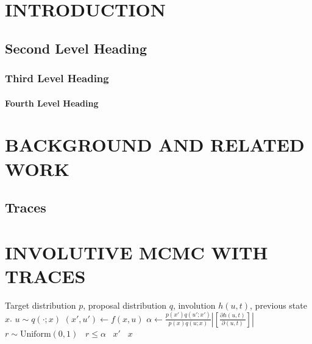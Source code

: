 \documentclass[twoside]{article}
\begin{document}
\section{INTRODUCTION}


\subsection{Second Level Heading}

\subsubsection{Third Level Heading}

\paragraph{Fourth Level Heading}

\section{BACKGROUND AND RELATED WORK}

\subsection{Traces}



\section{INVOLUTIVE MCMC WITH TRACES}

\begin{algorithmic}
\Require Target distribution $p$, proposal distribution $q$, involution $h(u, t)$, previous state $x$.
    \State $u \sim q(\cdot; x)$ 
    \State $(x', u') \gets f(x, u)$ 
    \State $\alpha \gets
        \frac{p(x') q(u'; x')}{p(x) q(u; x)} \left| \left[ \frac{\partial h(u, t)}{\partial (u, t)} \right] \right|$
    \State $r \sim \mathrm{Uniform}(0, 1)$
    \State \algorithmicif \, $r \le \alpha$ \algorithmicthen \, \Return $x'$ \algorithmicelse \, \Return $x$ 
\EndProcedure
\end{algorithmic}

\end{document}
